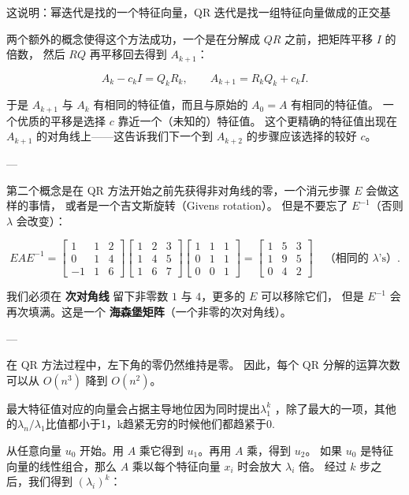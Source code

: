 这说明：幂迭代是找的一个特征向量，QR 迭代是找一组特征向量做成的正交基
\\
\begin{proposition}
    两个额外的概念使得这个方法成功，一个是在分解成 $QR$ 之前，把矩阵平移 $I$ 的倍数，
然后 $RQ$ 再平移回去得到 $A_{k+1}$：

\[
A_k - c_k I = Q_k R_k, 
\qquad 
A_{k+1} = R_k Q_k + c_k I.
\]

于是 $A_{k+1}$ 与 $A_k$ 有相同的特征值，而且与原始的 $A_0=A$ 有相同的特征值。
一个优质的平移是选择 $c$ 靠近一个（未知的）特征值。
这个更精确的特征值出现在 $A_{k+1}$ 的对角线上——这告诉我们下一个到 $A_{k+2}$ 的步骤应该选择的较好 $c$。

---

第二个概念是在 QR 方法开始之前先获得非对角线的零，一个消元步骤 $E$ 会做这样的事情，
或者是一个吉文斯旋转（Givens rotation）。
但是不要忘了 $E^{-1}$（否则 $\lambda$ 会改变）：

\[
E A E^{-1}
=
\begin{bmatrix}
1 & 1 & 2 \\
0 & 1 & 4 \\
-1 & 1 & 6
\end{bmatrix}
\begin{bmatrix}
1 & 2 & 3 \\
1 & 4 & 5 \\
1 & 6 & 7
\end{bmatrix}
\begin{bmatrix}
1 & 1 & 1 \\
0 & 1 & 1 \\
0 & 0 & 1
\end{bmatrix}
=
\begin{bmatrix}
1 & 5 & 3 \\
1 & 9 & 5 \\
0 & 4 & 2
\end{bmatrix}
\quad \text{（相同的 $\lambda$'s）}.
\]

我们必须在 \textbf{次对角线} 留下非零数 $1$ 与 $4$，更多的 $E$ 可以移除它们，
但是 $E^{-1}$ 会再次填满。这是一个 \textbf{海森堡矩阵}（一个非零的次对角线）。

---

在 QR 方法过程中，左下角的零仍然维持是零。
因此，每个 QR 分解的运算次数可以从 $O(n^3)$ 降到 $O(n^2)$。
\end{proposition}
\begin{proposition}[幂迭代与逆迭代]
最大特征值对应的向量会占据主导地位因为同时提出$\lambda_1^{k}$ ，除了最大的一项，其他的$\lambda_n/\lambda_1$比值都小于1，k趋紧无穷的时候他们都趋紧于0.  
\end{proposition}
从任意向量 $u_0$ 开始。用 $A$ 乘它得到 $u_1$。再用 $A$ 乘，得到 $u_2$。  
如果 $u_0$ 是特征向量的线性组合，那么 $A$ 乘以每个特征向量 $x_i$ 时会放大 $\lambda_i$ 倍。  
经过 $k$ 步之后，我们得到 $(\lambda_i)^k$：

